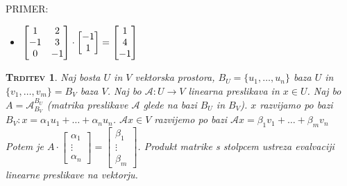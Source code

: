 \documentclass[a4paper,12pt]{article}
\newtheorem*{trditev}{\textsc{Trditev}}
\begin{document}
PRIMER:
\begin{itemize}
\item $\begin{bmatrix}
	1&2\\
	-1&3\\
	0&-1
\end{bmatrix} \cdot \begin{bmatrix}
	-1 \\
	1
\end{bmatrix} = \begin{bmatrix}
	1\\
	4\\
	-1
\end{bmatrix} \\$
\end{itemize}

\begin{trditev}
	Naj bosta $U$ in $V$ vektorska prostora, $B_U=\{u_1,\ldots,u_n\}$ baza $U$ in \linebreak $\{v_1,\ldots,v_m\}=B_V$ baza $V$. Naj bo $\mathcal{A}:U\to V$ linearna preslikava in $x\in U$. Naj bo \linebreak $A=\mathcal{A}_{B_V}^{B_U}$ (matrika preslikave $\mathcal{A}$ glede na bazi $B_U$ in $B_V$). $x$ razvijamo po bazi \linebreak  $B_V:x=\alpha_1u_1+\ldots+\alpha_nu_n$. $\mathcal{A}x\in V$ razvijemo po bazi $\mathcal{A}x=\beta_1v_1+\ldots+\beta_mv_n$ \\

	Potem je $A\cdot \begin{bmatrix}
		\alpha_1 \\ \vdots \\ \alpha_n
	\end{bmatrix} = \begin{bmatrix}
		\beta_1 \\ \vdots \\ \beta_m
	\end{bmatrix}$. Produkt matrike s stolpcem ustreza evalvaciji linearne preslikave na vektorju. \\
\end{trditev}
\end{document}
